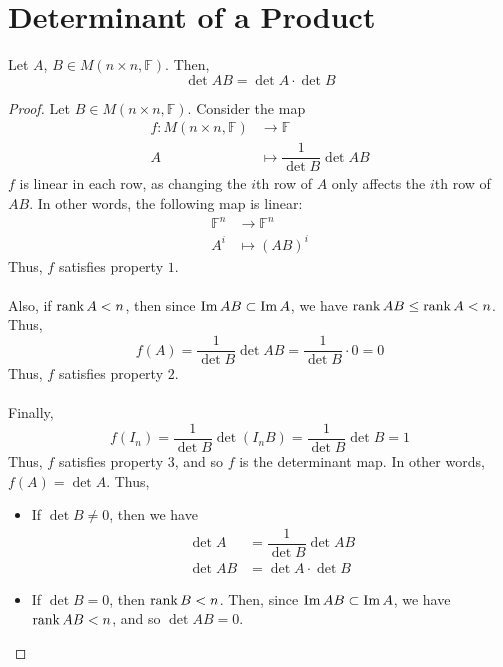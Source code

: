 \documentclass[letterpaper,12pt]{article}
\begin{document}
\section*{Determinant of a Product}
\begin{theorem}
Let $A$, $B \in M(n \times n, \mathbb{F})$. Then,
\begin{equation*}
    \boxed{\det{AB} = \det{A} \cdot \det{B}}
\end{equation*}
\end{theorem}
\begin{proof}
Let $B \in M(n \times n, \mathbb{F})$. Consider the map
\begin{align*}
    f: M(n \times n, \mathbb{F}) & \longrightarrow \mathbb{F} \\
    A & \longmapsto \dfrac{1}{\det{B}} \det{AB}
\end{align*}
$f$ is linear in each row, as changing the $i$th row of $A$ only affects the $i$th row of $AB$. In other words, the following map is linear:
\begin{align*}
    \mathbb{F}^n & \longrightarrow \mathbb{F}^n \\
    A^i & \longmapsto (AB)^i
\end{align*}
Thus, $f$ satisfies property $1$.
\\ \\ Also, if $\operatorname{rank}{A} < n$, then since $\operatorname{Im}{AB} \subset \operatorname{Im}{A}$, we have $\operatorname{rank}{AB} \leq \operatorname{rank}{A} < n$. Thus,
\begin{equation*}
    f(A) = \dfrac{1}{\det{B}} \det{AB} = \dfrac{1}{\det{B}} \cdot 0 = 0
\end{equation*}
Thus, $f$ satisfies property $2$.
\\ \\ Finally,
\begin{equation*}
    f(I_n) = \dfrac{1}{\det{B}} \det(I_n B) = \dfrac{1}{\det{B}} \det{B} = 1
\end{equation*}
Thus, $f$ satisfies property $3$, and so $f$ is the determinant map. In other words, $f(A) = \det{A}$. Thus,
\begin{itemize}
    \item If $\det{B} \neq 0$, then we have
    \begin{align*}
        \det{A} & = \dfrac{1}{\det{B}} \det{AB} \\
        \det{AB} & = \det{A} \cdot \det{B}
    \end{align*}
    \item If $\det{B} = 0$, then $\operatorname{rank}{B} < n$. Then, since $\operatorname{Im}{AB} \subset \operatorname{Im}{A}$, we have $\operatorname{rank}{AB} < n$, and so $\det{AB} = 0$.
\end{itemize}
\end{proof}
\end{document}
